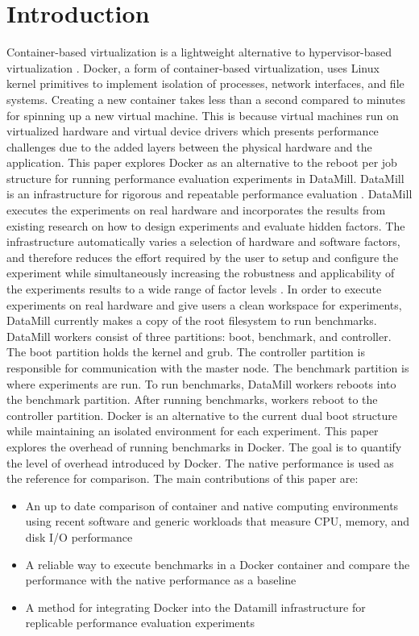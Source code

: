 \documentclass[11pt]{article}
\begin{document}
\section{Introduction}
Container-based virtualization is a lightweight alternative to hypervisor-based virtualization \cite{morabito}. Docker, a form of container-based virtualization, uses Linux kernel primitives to implement isolation of processes, network interfaces, and file systems. Creating a new container takes less than a second compared to minutes for spinning up a new virtual machine. This is because virtual machines run on virtualized hardware and virtual device drivers which presents performance challenges due to the added layers between the physical hardware and the application. This paper explores Docker as an alternative to the reboot per job structure for running performance evaluation experiments in DataMill. 
DataMill is an infrastructure for rigorous and repeatable performance evaluation \cite{augusto}. DataMill executes the experiments on real hardware and incorporates the results from existing research on how to design experiments and evaluate hidden factors. The infrastructure automatically varies a selection of hardware and software factors, and therefore reduces the effort required by the user to setup and configure the experiment while simultaneously increasing the robustness and applicability of the experiments results to a wide range of factor levels \cite{augusto}. In order to execute experiments on real hardware and give users a clean workspace for experiments, DataMill currently makes a copy of the root filesystem to run benchmarks. DataMill workers consist of three partitions: boot, benchmark, and controller. The boot partition holds the kernel and grub. The controller partition is responsible for communication with the master node. The benchmark partition is where experiments are run. To run benchmarks, DataMill workers reboots into the benchmark partition. After running benchmarks, workers reboot to the controller partition. 
Docker is an alternative to the current dual boot structure while maintaining an isolated environment for each experiment. This paper explores the overhead of running benchmarks in Docker. The goal is to quantify the level of overhead introduced by Docker. The native performance is used as the reference for comparison. The main contributions of this paper are:
\begin{itemize}
	\item An up to date comparison of container and native computing environments using recent software and generic workloads that measure CPU, memory, and disk I/O performance
	\item A reliable way to execute benchmarks in a Docker container and compare the performance with the native performance as a baseline
	\item A method for integrating Docker into the Datamill infrastructure for replicable performance evaluation experiments
\end{itemize}
\end{document}
